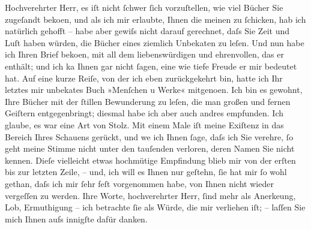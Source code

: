 \pstart\center{}Hochverehrter Herr,\pend\vspace{0.5em}
\pstart
           es iſt nicht{ }ſchwer{ }ſich vorzuſtellen, wie viel Bücher Sie zugeſandt beko{\geminationm}en, und als ich mir erlaubte, Ihnen die meinen zu{ }ſchicken,
               hab ich natürlich gehofft – habe aber gewiſs nicht darauf gerechnet, daſs Sie Zeit
               und Luſt haben würden, die Bücher eines ziemlich Unbeka{\geminationn}ten zu leſen. Und nun habe ich Ihren Brief beko{\geminationm}en,
               mit all dem liebens{\pb}würdigen und ehrenvollen, das
               er enthält; und ich ka{\geminationn} Ihnen gar nicht{ }ſagen, eine wie
               tiefe Freude er mir bedeutet hat. Auf eine kurze Reiſe, von der ich eben
               zurückgekehrt bin, hatte ich Ihr letztes mir unbeka{\geminationn}tes
               Buch »Menſchen u Werke« mitgeno{\geminationm}en. Ich bin es gewohnt, Ihre Bücher mit der{ }ſtillen
               Bewunderung zu leſen, die man großen und fernen Geiſtern entgegen{\pb}bringt; diesmal habe ich aber auch andres
               empfunden. Ich glaube, es war eine Art von Stolz. Mit einem Male iſt meine Exiſtenz
               in das Bereich Ihres Schauens gerückt, und we{\geminationn} ich Ihnen{ }ſage, daſs ich Sie verehre,{ }ſo geht meine Stimme nicht unter den tauſenden verloren,
               deren Namen Sie nicht kennen. Dieſe vielleicht etwas hochmütige Empfindung blieb mir
                  {\pb}von der erſten bis zur letzten Zeile, – und,
               ich will es Ihnen nur geſtehn,{ }ſie hat mir{ }ſo wohl gethan, daſs ich mir{ }ſehr feſt
               vorgenommen habe, von Ihnen nicht wieder vergeſſen zu werden. Ihre Worte,
               hochverehrter Herr,{ }ſind mehr als Anerke{\geminationn}ung, Lob,
               Ermuthigung – ich betrachte{ }ſie als Würde, die mir verliehen iſt; – laſſen Sie mich
               Ihnen aufs innigſte dafür {\pb}danken.\pend
           
